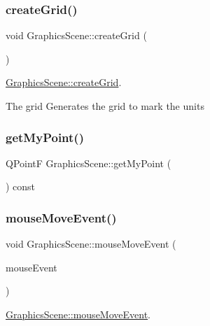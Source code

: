 \subsubsection{\texorpdfstring{create\+Grid()}{createGrid()}}
{\footnotesize\ttfamily void Graphics\+Scene\+::create\+Grid (\begin{DoxyParamCaption}{ }\end{DoxyParamCaption})}



\hyperlink{class_graphics_scene_aa6c883ed523812e7aec5018888b72ee1}{Graphics\+Scene\+::create\+Grid}. 

\begin{DoxyParagraph}{The grid}
Generates the grid to mark the units 
\end{DoxyParagraph}
\mbox{\label{class_graphics_scene_aa341f24da86296d2f06fe485857b54b5}} 
\subsubsection{\texorpdfstring{get\+My\+Point()}{getMyPoint()}}
{\footnotesize\ttfamily Q\+PointF Graphics\+Scene\+::get\+My\+Point (\begin{DoxyParamCaption}{ }\end{DoxyParamCaption}) const}

\mbox{\label{class_graphics_scene_a1bc5a1a813d1ff00bba4e919ed1b7525}} 
\subsubsection{\texorpdfstring{mouse\+Move\+Event()}{mouseMoveEvent()}}
{\footnotesize\ttfamily void Graphics\+Scene\+::mouse\+Move\+Event (\begin{DoxyParamCaption}\item[{Q\+Graphics\+Scene\+Mouse\+Event $\ast$}]{mouse\+Event }\end{DoxyParamCaption})\hspace{0.3cm}{\ttfamily [override]}}



\hyperlink{class_graphics_scene_a1bc5a1a813d1ff00bba4e919ed1b7525}{Graphics\+Scene\+::mouse\+Move\+Event}. 


